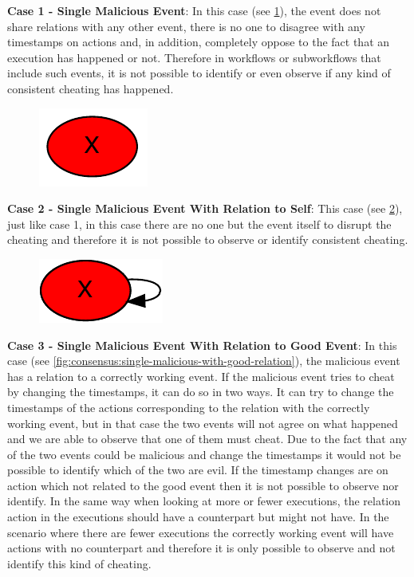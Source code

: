 	\newpar \textbf{Case 1 - Single Malicious Event}: In this case (see \ref{fig:consensus:single-malicious}), the event does not share relations with any other event, there is no one to disagree with any timestamps on actions and, in addition, completely oppose to the fact that an execution has happened or not. Therefore in workflows or subworkflows that include such events, it is not possible to identify or even observe if any kind of consistent cheating has happened.
	
	\begin{figure}[H]
		\centering
		\includegraphics[]{5validation/images/1.pdf}
		\caption{}
		\label{fig:consensus:single-malicious}
	\end{figure}
	
	
	\newpar \textbf{Case 2 - Single Malicious Event With Relation to Self}: This case (see \ref{fig:consensus:single-malicious-with-relation}), just like case 1, in this case there are no one but the event itself to disrupt the cheating and therefore it is not possible to observe or identify consistent cheating.
	
	\begin{figure}[H]
		\centering
		\includegraphics[]{5validation/images/5.pdf}
		\caption{}
		\label{fig:consensus:single-malicious-with-relation}
	\end{figure}
	
	\newpar \textbf{Case 3 - Single Malicious Event With Relation to Good Event}: In this case (see \ref{fig:consensus:single-malicious-with-good-relation}), the malicious event has a relation to a correctly working event. If the malicious event tries to cheat by changing the timestamps, it can do so in two ways. It can try to change the timestamps of the actions corresponding to the relation with the correctly working event, but in that case the two events will not agree on what happened and we are able to observe that one of them must cheat. Due to the fact that any of the two events could be malicious and change the timestamps it would not be possible to identify which of the two are evil.
	If the timestamp changes are on action which not related to the good event then it is not possible to observe nor identify. 
	In the same way when looking at more or fewer executions, the relation action in the executions should have a counterpart but might not have. In the scenario where there are fewer executions the correctly working event will have actions with no counterpart and therefore it is only possible to observe and not identify this kind of cheating. 
	

